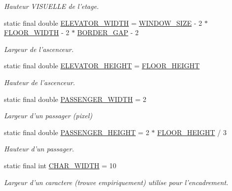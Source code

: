 \begin{DoxyCompactItemize}
\begin{DoxyCompactList}\small\item\em Hauteur V\-I\-S\-U\-E\-L\-L\-E de l'etage. \end{DoxyCompactList}\item 
static final double \hyperlink{classDefines_a6db91ad53210c6221ec3539abdd86888}{E\-L\-E\-V\-A\-T\-O\-R\-\_\-\-W\-I\-D\-T\-H} = \hyperlink{classDefines_aafb660e1c1534aec4d2cee6cfe57029f}{W\-I\-N\-D\-O\-W\-\_\-\-S\-I\-Z\-E} -\/ 2 $\ast$ \hyperlink{classDefines_ad5528ce6b91911a4ca4e9f364543ef9c}{F\-L\-O\-O\-R\-\_\-\-W\-I\-D\-T\-H} -\/ 2 $\ast$ \hyperlink{classDefines_ae1cb2849525afcbee188dd5681a29f2f}{B\-O\-R\-D\-E\-R\-\_\-\-G\-A\-P} -\/ 2
\begin{DoxyCompactList}\small\item\em Largeur de l'ascenceur. \end{DoxyCompactList}\item 
static final double \hyperlink{classDefines_abe0b8ba696fb8c7c3834901f0d1d654e}{E\-L\-E\-V\-A\-T\-O\-R\-\_\-\-H\-E\-I\-G\-H\-T} = \hyperlink{classDefines_a2a43fe315bf385b8693c70fbf824a3d0}{F\-L\-O\-O\-R\-\_\-\-H\-E\-I\-G\-H\-T}
\begin{DoxyCompactList}\small\item\em Hauteur de l'ascenceur. \end{DoxyCompactList}\item 
static final double \hyperlink{classDefines_a0cfe94bdf035c76ba9900a7022cef92b}{P\-A\-S\-S\-E\-N\-G\-E\-R\-\_\-\-W\-I\-D\-T\-H} = 2
\begin{DoxyCompactList}\small\item\em Largeur d'un passager (pixel) \end{DoxyCompactList}\item 
static final double \hyperlink{classDefines_a651291f3b8a00e1e92a7275cf3d2430e}{P\-A\-S\-S\-E\-N\-G\-E\-R\-\_\-\-H\-E\-I\-G\-H\-T} = 2 $\ast$ \hyperlink{classDefines_a2a43fe315bf385b8693c70fbf824a3d0}{F\-L\-O\-O\-R\-\_\-\-H\-E\-I\-G\-H\-T} / 3
\begin{DoxyCompactList}\small\item\em Hauteur d'un passager. \end{DoxyCompactList}\item 
static final int \hyperlink{classDefines_a35af074df13dcc76204831f1910d2353}{C\-H\-A\-R\-\_\-\-W\-I\-D\-T\-H} = 10
\begin{DoxyCompactList}\small\item\em Largeur d'un caractere (trouve empiriquement) utilise pour l'encadrement. \end{DoxyCompactList}\item 

\end{DoxyCompactItemize}
